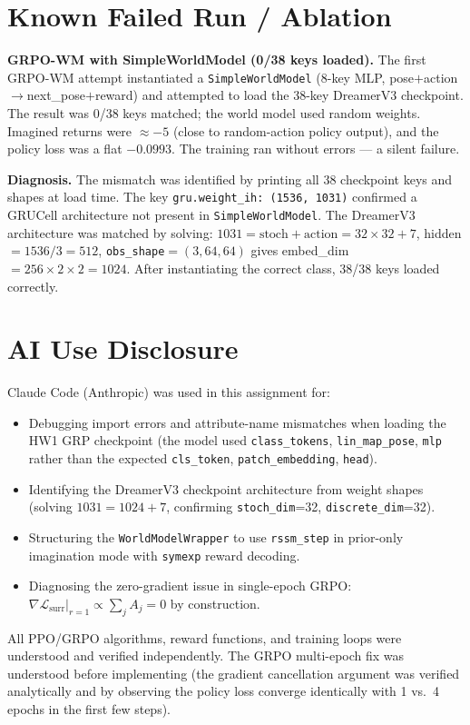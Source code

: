 \documentclass[11pt,letterpaper]{article}
\begin{document}
\section{Known Failed Run / Ablation}

\textbf{GRPO-WM with SimpleWorldModel (0/38 keys loaded).} The first GRPO-WM attempt instantiated a \texttt{SimpleWorldModel} (8-key MLP, pose$+$action$\to$next\_pose$+$reward) and attempted to load the 38-key DreamerV3 checkpoint. The result was 0/38 keys matched; the world model used random weights. Imagined returns were $\approx -5$ (close to random-action policy output), and the policy loss was a flat $-0.0993$. The training ran without errors — a silent failure.

\textbf{Diagnosis.} The mismatch was identified by printing all 38 checkpoint keys and shapes at load time. The key \texttt{gru.weight\_ih: (1536, 1031)} confirmed a GRUCell architecture not present in \texttt{SimpleWorldModel}. The DreamerV3 architecture was matched by solving: $1031 = \text{stoch} + \text{action} = 32\times32 + 7$, hidden$=1536/3=512$, \texttt{obs\_shape}$=(3,64,64)$ gives embed\_dim$=256\times2\times2=1024$. After instantiating the correct class, 38/38 keys loaded correctly.

\section{AI Use Disclosure}

Claude Code (Anthropic) was used in this assignment for:
\begin{itemize}
  \item Debugging import errors and attribute-name mismatches when loading the HW1 GRP checkpoint (the model used \texttt{class\_tokens}, \texttt{lin\_map\_pose}, \texttt{mlp} rather than the expected \texttt{cls\_token}, \texttt{patch\_embedding}, \texttt{head}).
  \item Identifying the DreamerV3 checkpoint architecture from weight shapes (solving $1031=1024+7$, confirming \texttt{stoch\_dim}=32, \texttt{discrete\_dim}=32).
  \item Structuring the \texttt{WorldModelWrapper} to use \texttt{rssm\_step} in prior-only imagination mode with \texttt{symexp} reward decoding.
  \item Diagnosing the zero-gradient issue in single-epoch GRPO: $\nabla\mathcal{L}_\text{surr}|_{r=1} \propto \sum_j A_j = 0$ by construction.
\end{itemize}
All PPO/GRPO algorithms, reward functions, and training loops were understood and verified independently. The GRPO multi-epoch fix was understood before implementing (the gradient cancellation argument was verified analytically and by observing the policy loss converge identically with 1 vs.\ 4 epochs in the first few steps).
\end{document}
